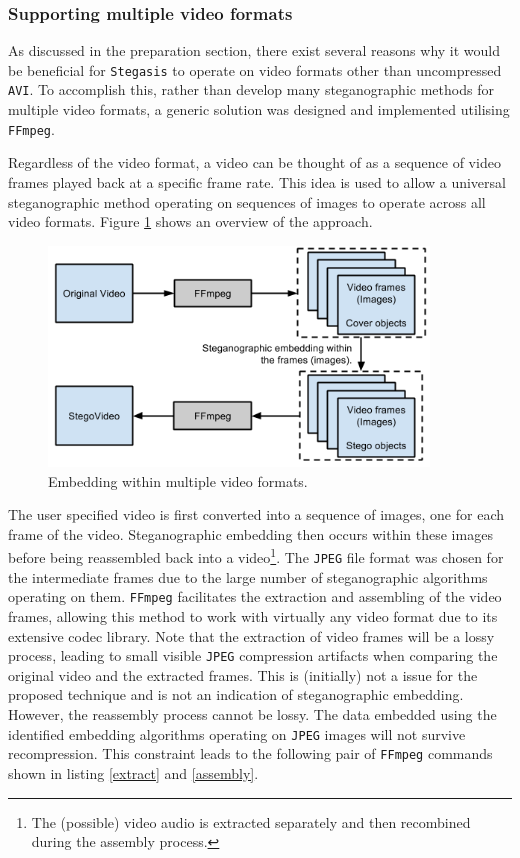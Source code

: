 \documentclass[paper=a4, fontsize=11pt,twoside]{scrartcl}    %
\numberwithin{table}{section}
\numberwithin{figure}{section}
\numberwithin{algorithm}{section}
\begin{document}
\subsubsection{Supporting multiple video formats}
\label{extffmpeg}

As discussed in the preparation section, there exist several reasons why it would be beneficial for \texttt{Stegasis} to operate on video formats other than uncompressed \texttt{AVI}. To accomplish this, rather than develop many steganographic methods for multiple video formats, a generic solution was designed and implemented utilising \texttt{FFmpeg}.

Regardless of the video format, a video can be thought of as a sequence of video frames played back at a specific frame rate. This idea is used to allow a universal steganographic method operating on sequences of images to operate across all video formats. Figure \ref{multi} shows an overview of the approach.

\begin{figure}[!htb]
\centerline{\includegraphics[width=0.9\textwidth]{images/multi.png}}
\caption{Embedding within multiple video formats.}
\label{multi}
\end{figure}

The user specified video is first converted into a sequence of images, one for each frame of the video. Steganographic embedding then occurs within these images before being reassembled back into a video\footnote{The (possible) video audio is extracted separately and then recombined during the assembly process.}. The \texttt{JPEG} file format was chosen for the intermediate frames due to the large number of steganographic algorithms operating on them. \texttt{FFmpeg} facilitates the extraction and assembling of the video frames, allowing this method to work with virtually any video format due to its extensive codec library. Note that the extraction of video frames will be a lossy process, leading to small visible \texttt{JPEG} compression artifacts when comparing the original video and the extracted frames. This is (initially) not a issue for the proposed technique and is not an indication of steganographic embedding. However, the reassembly process cannot be lossy. The data embedded using the identified embedding algorithms operating on \texttt{JPEG} images will not survive recompression. This constraint leads to the following pair of \texttt{FFmpeg} commands shown in listing \ref{extract} and \ref{assembly}.
\end{document}
